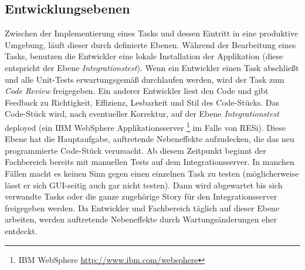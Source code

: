 \subsection{Entwicklungsebenen}
Zwischen der Implementierung eines Tasks  und dessen Eintritt in eine produktive Umgebung, läuft dieser durch definierte Ebenen. Während der Bearbeitung eines Tasks, benutzen die Entwickler eine lokale Installation der Applikation (diese entspricht der Ebene \textit{Integrationstest}). Wenn ein Entwickler einen Task abschließt und alle Unit-Tests erwartungsgemäß durchlaufen werden, wird der Task zum \textit{Code Review} freigegeben. Ein anderer Entwickler liest den Code und gibt Feedback zu Richtigkeit, Effizienz, Lesbarkeit und Stil des Code-Stücks. Das Code-Stück wird, nach eventueller Korrektur, auf der Ebene \textit{Integrationstest} deployed (ein IBM WebSphere Applikationsserver \footnote{IBM WebSphere \url{http://www.ibm.com/websphere}} im Falle von RESi). Diese Ebene hat die Hauptaufgabe, auftretende Nebeneffekte aufzudecken, die das neu programmierte Code-Stück verursacht. Ab diesem Zeitpunkt beginnt der Fachbereich bereits mit manuellen Tests auf dem Integrationsserver. In manchen Fällen macht es keinen Sinn gegen einen einzelnen Task zu testen (möglicherweise lässt er sich GUI-seitig auch gar nicht testen). Dann wird abgewartet bis sich verwandte Tasks oder die ganze zugehörige Story für den Integrationsserver freigegeben werden. Da Entwickler und Fachbereich täglich auf dieser Ebene arbeiten, werden auftretende Nebeneffekte durch Wartungsänderungen eher entdeckt.\\
